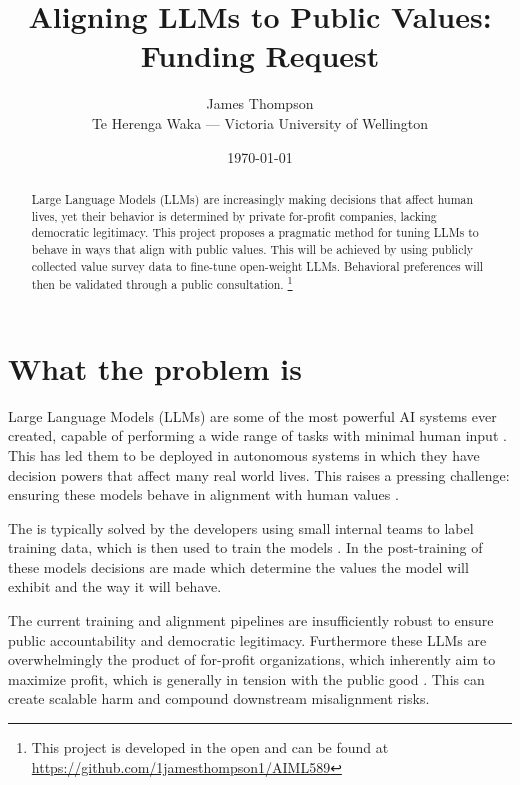 \documentclass[11pt, a4paper]{article}
\author{James Thompson\\Te Herenga Waka --- Victoria University of Wellington}
\date{\today}
\begin{document}
\title{Aligning LLMs to Public Values: Funding Request}

\maketitle

\vspace{-3em}

\renewcommand{\abstractname}{}
\begin{abstract}
	\vspace{-0.5em}
	Large Language Models (LLMs) are increasingly making decisions that affect human lives, yet their behavior is determined by private for-profit companies, lacking democratic legitimacy. This project proposes a pragmatic method for tuning LLMs to behave in ways that align with public values. This will be achieved by using publicly collected value survey data to fine-tune open-weight LLMs. Behavioral preferences will then be validated through a public consultation. \footnote{This project is developed in the open and can be found at \url{https://github.com/1jamesthompson1/AIML589}}
	\vspace{-0.5em}
\end{abstract}

\vspace{-1em}

\section{What the problem is}

Large Language Models (LLMs) are some of the most powerful AI systems ever created, capable of performing a wide range of tasks with minimal human input \cite{bommasaniOpportunitiesRisksFoundation2022}. This has led them to be deployed in autonomous systems in which they have decision powers that affect many real world lives. This raises a pressing challenge: ensuring these models behave in alignment with human values \cite{amodeiConcreteProblemsAI2016a,hendrycksUnsolvedProblemsML2022,bostromEthicsArtificialIntelligence2014}.

The  is typically solved by the developers using small internal teams to label training data, which is then used to train the models \cite{baiTrainingHelpfulHarmless2022, ouyangTrainingLanguageModels2022}. In the post-training of these models decisions are made which determine the values the model will exhibit and the way it will behave.

The current training and alignment pipelines are insufficiently robust to ensure public accountability and democratic legitimacy. Furthermore these LLMs are overwhelmingly the product of for-profit organizations, which inherently aim to maximize profit, which is generally in tension with the public good \cite{r.h.coarseProblemSocialCost,hendrycksAligningAIShared2023}. This can create scalable harm and compound downstream misalignment risks.
\end{document}
